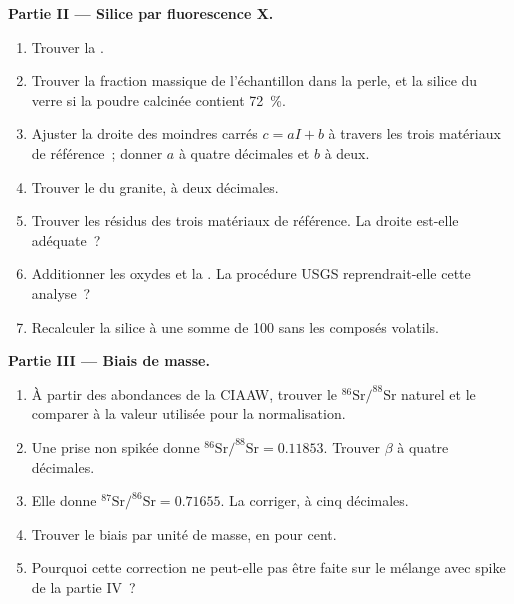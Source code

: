 \begin{problem}
\noindent\textbf{Partie II --- Silice par fluorescence X.}
\begin{enumerate}[resume]
  \item Trouver la .
  \item Trouver la fraction massique de l'échantillon dans la perle, et la silice du verre si la
        poudre calcinée contient \qty{72}{\percent}.
  \item Ajuster la droite des moindres carrés $c = aI + b$ à travers les trois matériaux de référence~; donner $a$ à
        quatre décimales et $b$ à deux.
  \item Trouver le  du granite, à deux décimales.
  \item Trouver les résidus des trois matériaux de référence. La droite est-elle adéquate~?
  \item Additionner les oxydes et la . La procédure USGS reprendrait-elle cette analyse~?
  \item Recalculer la silice à une somme de 100 sans les composés volatils.
\end{enumerate}

\noindent\textbf{Partie III --- Biais de masse.}
\begin{enumerate}[resume]
  \item À partir des abondances de la CIAAW, trouver le $^{86}\mathrm{Sr}/^{88}\mathrm{Sr}$ naturel et le comparer
        à la valeur utilisée pour la normalisation.
  \item Une prise non spikée donne $^{86}\mathrm{Sr}/^{88}\mathrm{Sr} = 0.11853$. Trouver $\beta$ à
        quatre décimales.
  \item Elle donne $^{87}\mathrm{Sr}/^{86}\mathrm{Sr} = 0.71655$. La corriger, à cinq décimales.
  \item Trouver le biais par unité de masse, en pour cent.
  \item Pourquoi cette correction ne peut-elle pas être faite sur le mélange avec spike de la partie IV~?
\end{enumerate}


\end{problem}
